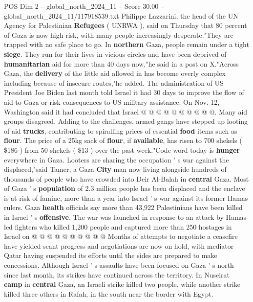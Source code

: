 \begin{textsample}{POS Dim 2 – global\_north\_2024\_11 – Score 30.00 – global\_north\_2024\_11/117918539.txt}
Philippe Lazzarini, the head of the UN Agency for Palestinian \textbf{Refugees} ( UNRWA ), said on Thursday that 80 percent of Gaza is now high-risk, with many people increasingly desperate."They are trapped with no safe place to go.
In \textbf{northern} Gaza, people remain under a tight \textbf{siege}.
They run for their lives in vicious circles and have been deprived of \textbf{humanitarian} aid for more than 40 days now,"he said in a post on X."Across Gaza, the \textbf{delivery} of the little aid allowed in has become overly complex including because of insecure routes,"he added.
The administration of US President Joe Biden last month told Israel it had 30 days to improve the flow of aid to Gaza or risk consequences to US military assistance.
On Nov. 12, Washington said it had concluded that Israel @ @ @ @ @ @ @ @ @ @.
Many aid groups disagreed.
Adding to the challenges, armed gangs have stepped up looting of aid \textbf{trucks}, contributing to spiralling prices of essential \textbf{food} items such as \textbf{flour}.
The price of a 25kg sack of \textbf{flour}, if \textbf{available}, has risen to 700 shekels ( \$186 ) from 50 shekels ( \$13 ) over the past week."Code-word today is \textbf{hunger} everywhere in Gaza.
Looters are sharing the occupation ' s war against the displaced,"said Tamer, a Gaza \textbf{City} man now living alongside hundreds of thousands of people who have crowded into Deir Al-Balah in \textbf{central} Gaza.
Most of Gaza ' s \textbf{population} of 2.3 million people has been displaced and the enclave is at risk of famine, more than a year into Israel ' s war against its former Hamas rulers.
Gaza \textbf{health} officials say more than 43,922 Palestinians have been killed in Israel ' s \textbf{offensive}.
The war was launched in response to an attack by Hamas-led fighters who killed 1,200 people and captured more than 250 hostages in Israel on @ @ @ @ @ @ @ @ @ @ Months of attempts to negotiate a ceasefire have yielded scant progress and negotiations are now on hold, with mediator Qatar having suspended its efforts until the sides are prepared to make concessions.
Although Israel ' s assaults have been focused on Gaza ' s north since last month, its strikes have continued across the territory.
In Nuseirat \textbf{camp} in \textbf{central} Gaza, an Israeli strike killed two people, while another strike killed three others in Rafah, in the south near the border with Egypt.

\end{textsample}
